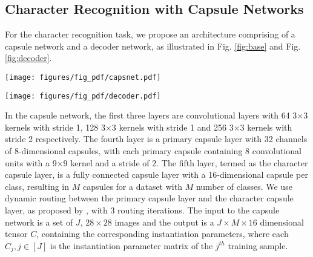 \subsection{Character Recognition with Capsule Networks} 
\label{sec:meth_full}

For the character recognition task, we propose an architecture comprising of a capsule network and a decoder network, as illustrated in Fig. \ref{fig:base} and Fig. \ref{fig:decoder}. 

\begin{figure*}[!h]
  \centering
  \texttt{[image: figures/fig\_pdf/capsnet.pdf]}
  \vspace{-2mm}
  \caption{\textbf{TextCap Model}: Proposed CapsNet model for character classification.}
 \label{fig:base}
 \vspace{-3mm}
\end{figure*}

\begin{figure*}[!h]
  \centering
  \texttt{[image: figures/fig\_pdf/decoder.pdf]}
  \caption{\textbf{TextCap Decoder}: Decoder network for the character reconstruction. Input to this network is obtained by masking the DigitCaps layer of the TextCap classifier}
 \label{fig:decoder}
  \vspace{-4mm}
\end{figure*}

In the capsule network, the first three layers are convolutional layers with 64 3$\times$3 kernels with stride 1, 128 3$\times$3 kernels with stride 1 and 256 3$\times$3 kernels with stride 2 respectively. The fourth layer is a primary capsule layer with 32 channels of 8-dimensional capsules, with each primary capsule containing 8 convolutional units with a 9$\times$9 kernel and a stride of 2. The fifth layer, termed as the character capsule layer, is a fully connected capsule layer with a 16-dimensional capsule per class, resulting in $M$ capsules for a dataset with $M$ number of classes. We use dynamic routing between the primary capsule layer and the character capsule layer, as proposed by \cite{sabour2017dynamic}, with 3 routing iterations. The input to the capsule network is a set of $J$, $28\times28$ images and the output is a $J\times M \times16$ dimensional tensor $C$, containing the corresponding instantiation parameters, where each $C_{j}, j\in[J]$ is the instantiation parameter matrix of the $j^{th}$ training sample.


